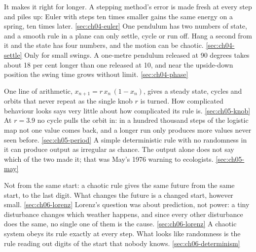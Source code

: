 %
  {It makes it right for longer. A stepping method's error is made fresh at every step and piles up: Euler with steps ten times smaller gains the same energy on a spring, ten times later.}%
  {\ref{sec:ch04-euler}}
%
  {One pendulum has two numbers of state, and a smooth rule in a plane can only settle, cycle or run off. Hang a second from it and the state has four numbers, and the motion can be chaotic.}%
  {\ref{sec:ch04-settle}}
%
  {Only for small swings. A one-metre pendulum released at 90 degrees takes about 18 per cent longer than one released at 10, and near the upside-down position the swing time grows without limit.}%
  {\ref{sec:ch04-phase}}

%
  {One line of arithmetic, $x_{n+1} = r\,x_n\,(1 - x_n)$, gives a steady state, cycles and orbits that never repeat as the single knob $r$ is turned. How complicated behaviour looks says very little about how complicated its rule is.}%
  {\ref{sec:ch05-knob}}
%
  {At $r = \num{3.9}$ no cycle pulls the orbit in: in a hundred thousand steps of the logistic map not one value comes back, and a longer run only produces more values never seen before.}%
  {\ref{sec:ch05-period}}
%
  {A simple deterministic rule with no randomness in it can produce output as irregular as chance. The output alone does not say which of the two made it; that was May's 1976 warning to ecologists.}%
  {\ref{sec:ch05-may}}

%
  {Not from the same start: a chaotic rule gives the same future from the same start, to the last digit. What changes the future is a changed start, however small.}%
  {\ref{sec:ch06-lorenz}}
%
  {Lorenz's question was about prediction, not power: a tiny disturbance changes which weather happens, and since every other disturbance does the same, no single one of them is the cause.}%
  {\ref{sec:ch06-lorenz}}
%
  {A chaotic system obeys its rule exactly at every step. What looks like randomness is the rule reading out digits of the start that nobody knows.}%
  {\ref{sec:ch06-determinism}}

